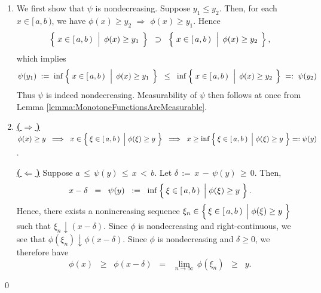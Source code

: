 \begin{enumerate}
\item
	We first show that $\psi$ is nondecreasing.
	Suppose $y_{1} \leq y_{2}$. Then, for each $x \in [\,a,b\,)$, we have
	$\phi(x) \geq y_{2}$ $\Longrightarrow$ $\phi(x) \geq y_{1}$.
	Hence
	\begin{equation*}
	\left\{\;
		x \in [\,a,b\,)
		\,\;\left\vert\;\,
			\overset{{\color{white}.}}{\phi}(x) \geq y_{1}
		\right.
		\;\right\}
	\;\; \supset \;\;
	\left\{\;
		x \in [\,a,b\,)
		\,\;\left\vert\;\,
			\overset{{\color{white}.}}{\phi}(x) \geq y_{2}
		\right.
		\;\right\},
	\end{equation*}
	which implies
	\begin{equation*}
	\psi(y_{1}) \; := \;
	\inf\left\{\;
		x \in [\,a,b\,)
		\,\;\left\vert\;\,
			\overset{{\color{white}.}}{\phi}(x) \geq y_{1}
		\right.
		\;\right\}
	\;\; \leq \;\;
	\inf\left\{\;
		x \in [\,a,b\,)
		\,\;\left\vert\;\,
			\overset{{\color{white}.}}{\phi}(x) \geq y_{2}
		\right.
		\;\right\}
	\; =: \; \psi(y_{2})
	\end{equation*}
	Thus $\psi$ is indeed nondecreasing.
	Measurability of $\psi$ then follows at once from Lemma \ref{lemma:MonotoneFunctionsAreMeasurable}.
\item
	\textbf{\underline{(\,$\Longrightarrow$\,)}}\quad
	$\phi(x) \geq y
	\;\;\Longrightarrow\;\;
		x \in \left\{\,\xi\in[\,a,b\,) \;\left\vert\; \phi(\xi) \overset{{\color{white}.}}{\geq} y\right.\,\right\}
	\;\; \Longrightarrow \;\;
		x \geq \inf\left\{\,\xi\in[\,a,b\,) \;\left\vert\; \phi(\xi) \overset{{\color{white}.}}{\geq} y\right.\,\right\} =: \psi(y)$.

	\vskip 0.2cm
	\noindent
	\textbf{\underline{(\,$\Longleftarrow$\,)}}\quad
	Suppose \;$a \,\leq\, \psi(y) \,\leq\, x \,<\, b$.\;
	Let \;$\delta \,:=\, x \,-\, \psi(y) \,\geq\, 0$. Then,
	\begin{equation*}
	x - \delta \;\;=\;\; \psi(y) \;\;:=\;\; \inf\left\{\,\xi\in[\,a,b\,) \;\left\vert\; \phi(\xi) \overset{{\color{white}.}}{\geq} y\right.\,\right\}.
	\end{equation*}
	Hence, there exists a nonincreasing sequence
	$\xi_{n} \in \left\{\,\xi\in[\,a,b\,) \;\left\vert\; \phi(\xi) \overset{{\color{white}.}}{\geq} y\right.\,\right\}$
	such that $\xi_{n} \downarrow (x-\delta)$.
	Since $\phi$ is {\color{red}nondecreasing and right-continuous}, we see that $\phi(\xi_{n}) \downarrow \phi(x-\delta)$.
	Since $\phi$ is nondecreasing and $\delta \geq 0$, we therefore have
	\begin{equation*}
	\phi(x) \;\;\geq\;\; \phi(x-\delta) \;\;=\;\; \underset{n\rightarrow\infty}{\lim}\,\phi(\xi_{n}) \;\;\geq\;\; y.
	\end{equation*}
\end{enumerate}
\qed

